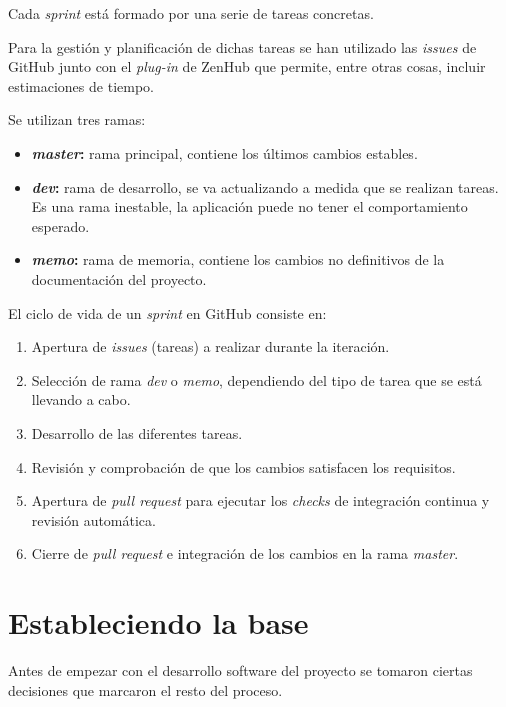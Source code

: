 Cada \textit{sprint} está formado por una serie de tareas concretas.

Para la gestión y planificación de dichas tareas se han utilizado las \textit{issues} de GitHub junto con el \textit{plug-in} de ZenHub que permite, entre otras cosas, incluir estimaciones de tiempo.


Se utilizan tres ramas:

\begin{itemize}
\tightlist
	\item \textbf{\textit{master}:} rama principal, contiene los últimos cambios estables.
	\item \textbf{\textit{dev}:} rama de desarrollo, se va actualizando a medida que se realizan tareas. Es una rama inestable, la aplicación puede no tener el comportamiento esperado.
	\item \textbf{\textit{memo}:} rama de memoria, contiene los cambios no definitivos de la documentación del proyecto.
\end{itemize}


El ciclo de vida de un \textit{sprint} en GitHub consiste en:

\begin{enumerate}
	\item Apertura de \textit{issues} (tareas) a realizar durante la iteración.
	\item Selección de rama \textit{dev} o \textit{memo}, dependiendo del tipo de tarea que se está llevando a cabo.
	\item Desarrollo de las diferentes tareas.
	\item Revisión y comprobación de que los cambios satisfacen los requisitos.
	\item Apertura de \textit{pull request} para ejecutar los \textit{checks} de integración continua y revisión automática.
	\item Cierre de \textit{pull request} e integración de los cambios en la rama \textit{master}.
\end{enumerate}

\section{Estableciendo la base}

Antes de empezar con el desarrollo software del proyecto se tomaron ciertas decisiones que marcaron el resto del proceso.


